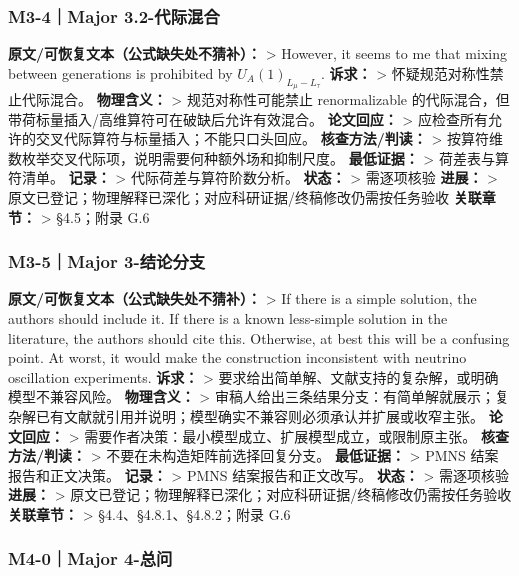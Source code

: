 \documentclass[
  chinese,
  UTF8]{ctexart}
\begin{document}
\subsubsection{M3-4｜Major
3.2-代际混合}\label{m3-4major-3.2-ux4ee3ux9645ux6df7ux5408}

\textbf{原文/可恢复文本（公式缺失处不猜补）：} \textgreater{} However,
it seems to me that mixing between generations is prohibited by
\(U_A(1)_{L_{\mu}-L_{\tau}}\). \textbf{诉求：} \textgreater{}
怀疑规范对称性禁止代际混合。 \textbf{物理含义：} \textgreater{}
规范对称性可能禁止 renormalizable
的代际混合，但带荷标量插入/高维算符可在破缺后允许有效混合。
\textbf{论文回应：} \textgreater{}
应检查所有允许的交叉代际算符与标量插入；不能只口头回应。
\textbf{核查方法/判读：} \textgreater{}
按算符维数枚举交叉代际项，说明需要何种额外场和抑制尺度。
\textbf{最低证据：} \textgreater{} 荷差表与算符清单。 \textbf{记录：}
\textgreater{} 代际荷差与算符阶数分析。 \textbf{状态：} \textgreater{}
需逐项核验 \textbf{进展：} \textgreater{}
原文已登记；物理解释已深化；对应科研证据/终稿修改仍需按任务验收
\textbf{关联章节：} \textgreater{} §4.5；附录 G.6

\subsubsection{M3-5｜Major
3-结论分支}\label{m3-5major-3-ux7ed3ux8bbaux5206ux652f}

\textbf{原文/可恢复文本（公式缺失处不猜补）：} \textgreater{} If there
is a simple solution, the authors should include it. If there is a known
less-simple solution in the literature, the authors should cite this.
Otherwise, at best this will be a confusing point. At worst, it would
make the construction inconsistent with neutrino oscillation
experiments. \textbf{诉求：} \textgreater{}
要求给出简单解、文献支持的复杂解，或明确模型不兼容风险。
\textbf{物理含义：} \textgreater{}
审稿人给出三条结果分支：有简单解就展示；复杂解已有文献就引用并说明；模型确实不兼容则必须承认并扩展或收窄主张。
\textbf{论文回应：} \textgreater{}
需要作者决策：最小模型成立、扩展模型成立，或限制原主张。
\textbf{核查方法/判读：} \textgreater{} 不要在未构造矩阵前选择回复分支。
\textbf{最低证据：} \textgreater{} PMNS 结案报告和正文决策。
\textbf{记录：} \textgreater{} PMNS 结案报告和正文改写。 \textbf{状态：}
\textgreater{} 需逐项核验 \textbf{进展：} \textgreater{}
原文已登记；物理解释已深化；对应科研证据/终稿修改仍需按任务验收
\textbf{关联章节：} \textgreater{} §4.4、§4.8.1、§4.8.2；附录 G.6

\subsubsection{M4-0｜Major 4-总问}\label{m4-0major-4-ux603bux95ee}
\end{document}
